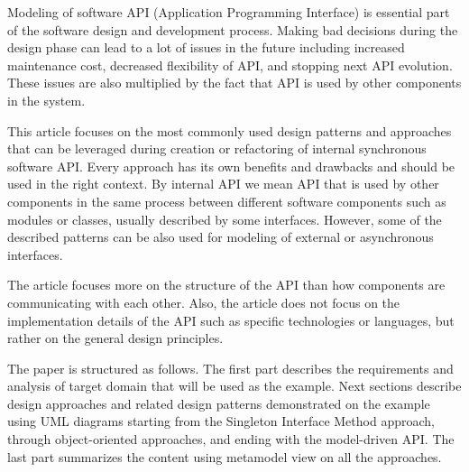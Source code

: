 Modeling of software API (Application Programming Interface) is essential part of the software design
and development process.
Making bad decisions during the design phase can lead to a lot of issues in the future including
increased maintenance cost, decreased flexibility of API, and stopping next API evolution.
These issues are also multiplied by the fact that API is used by other components in the system.

This article focuses on the most commonly used design patterns and approaches that can be leveraged during creation
or refactoring of internal synchronous software API. Every approach has its own benefits and drawbacks and should be
used in the right context.
By internal API we mean API that is used by other components in the same process between different software components
such as modules or classes, usually described by some interfaces.
However, some of the described patterns can be also used for modeling of external or asynchronous interfaces.

The article focuses more on the structure of the API than how components are communicating with each other.
Also, the article does not focus on the implementation details of the API such as specific technologies or languages,
but rather on the general design principles.

The paper is structured as follows.
The first part describes the requirements and analysis of target domain that will be used as the example.
Next sections describe design approaches and related design patterns demonstrated on the example using UML diagrams
starting from the Singleton Interface Method approach, through object-oriented approaches,
and ending with the model-driven API\@.
The last part summarizes the content using metamodel view on all the approaches.
